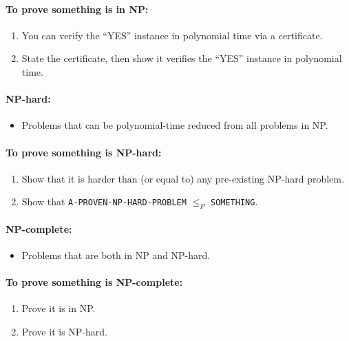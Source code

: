 \documentclass[9pt]{extarticle}
\begin{document}
\paragraph{To prove something is in NP:}
\begin{enumerate}
    \item You can verify the “YES” instance in polynomial time via a certificate.
    \item State the certificate, then show it verifies the “YES” instance in polynomial time.
\end{enumerate}

\paragraph{NP-hard:}
\begin{itemize}
    \item Problems that can be polynomial-time reduced from all problems in NP.
\end{itemize}

\paragraph{To prove something is NP-hard:}
\begin{enumerate}
    \item Show that it is harder than (or equal to) any pre-existing NP-hard problem.
    \item Show that \texttt{A-PROVEN-NP-HARD-PROBLEM} $\leq_P$ \texttt{SOMETHING}.
\end{enumerate}

\paragraph{NP-complete:}
\begin{itemize}
    \item Problems that are both in NP and NP-hard.
\end{itemize}

\paragraph{To prove something is NP-complete:}
\begin{enumerate}
    \item Prove it is in NP.
    \item Prove it is NP-hard.
\end{enumerate}
\end{document}
